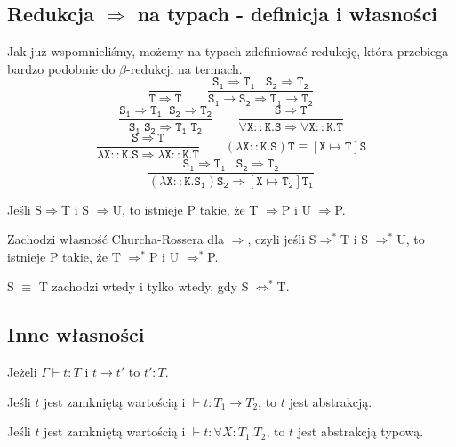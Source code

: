 \documentclass[11pt,leqno]{article}
\begin{document}
\subsection{Redukcja $\mathtt{\Rightarrow}$ na typach - definicja i własności}

Jak już wspomnieliśmy, możemy na typach zdefiniować redukcję, która przebiega bardzo podobnie do $\beta$-redukcji na termach.\\

	\[\mathtt{
		\frac{}{T \Rightarrow T}
                \qquad
                \frac{S_1 \Rightarrow T_1 \;\;\; S_2 \Rightarrow T_2}{S_1 \rightarrow S_2 \Rightarrow T_1 \rightarrow T_2}}
	\]
	\[\mathtt{
                \frac{S_1 \Rightarrow T_1 \;\; S_2 \Rightarrow T_2}{S_1\;S_2 \Rightarrow T_1\;T_2}
                \qquad
                \frac{S \Rightarrow T}{\forall X::K.S \Rightarrow \forall X::K.T} }
	\]
	\[\mathtt{
		\frac{S \Rightarrow T}{\lambda X::K.S \Rightarrow \lambda X::K.T}
                \qquad
                (\lambda X::K.S)T \equiv [X \mapsto T]S}
	\] 
	\[\mathtt{
                \frac{S_1 \Rightarrow T_1 \;\;\; S_2 \Rightarrow T_2}{(\lambda X::K.S_1)S_2 \Rightarrow [X \mapsto T_2]T_1 }}
	\]


\begin{lemat}
Jeśli S$\Rightarrow $T i S $\Rightarrow $U, to istnieje P takie, że T $\Rightarrow$P i U $\Rightarrow$P.
\end{lemat}
\begin{lemat}
Zachodzi własność Churcha-Rossera dla $\Rightarrow$, czyli jeśli S$\Rightarrow ^*$T i S $\Rightarrow ^*$U, to istnieje P takie, że T $\Rightarrow ^*$P i U $\Rightarrow ^*$P.
\end{lemat}
\begin{lemat}
S $\equiv$ T zachodzi wtedy i tylko wtedy, gdy S $\Leftrightarrow^*$T.
\end{lemat}

\subsection{Inne własności}

\begin{twierdzenie}
Jeżeli $\Gamma \vdash t:T$ i $t \rightarrow t'$ to $t':T$.
\end{twierdzenie}

\begin{lemat}
Jeśli $t$ jest zamkniętą wartością i $\vdash t:T_1 \rightarrow T_2$, to $t$ jest abstrakcją.  
\end{lemat}
\begin{lemat}
Jeśli $t$ jest zamkniętą wartością i $\vdash t:\forall X:T_1.T_2$, to $t$ jest abstrakcją typową. 
\end{lemat}
\end{document}
